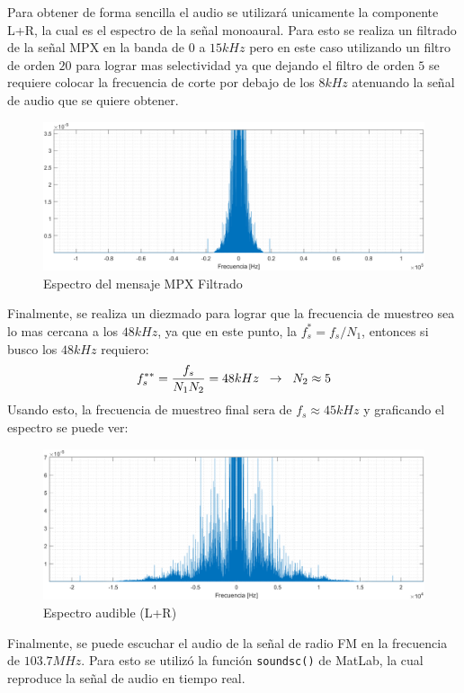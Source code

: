 Para obtener de forma sencilla el audio se utilizará unicamente la componente L+R, la cual es el espectro de la señal monoaural. Para esto se realiza un filtrado de la señal MPX en la banda de $0$ a $15kHz$ pero en este caso utilizando un filtro de orden $20$ para lograr mas selectividad ya que dejando el filtro de orden $5$ se requiere colocar la frecuencia de corte por debajo de los $8kHz$ atenuando la señal de audio que se quiere obtener.
\begin{figure}[H]
    \centering
    \includegraphics[width=\columnwidth]{images/2.5-mpx-filtrado.png}
    \caption{Espectro del mensaje MPX Filtrado}
    \label{fig:imagen8}
\end{figure}
Finalmente, se realiza un diezmado para lograr que la frecuencia de muestreo sea lo mas cercana a los $48kHz$, ya que en este punto, la $f^{*}_{s}=f_{s}/N_{1}$, entonces si busco los $48kHz$ requiero:
$$
f^{**}_{s} = \frac{f_{s}}{N_{1} N_{2}} = 48kHz
\hspace{2mm}\to\hspace{2mm}
N_{2} \approx 5
$$
Usando esto, la frecuencia de muestreo final sera de $f_{s} \approx 45kHz$ y graficando el espectro se puede ver:
\begin{figure}[H]
    \centering
    \includegraphics[width=\columnwidth]{images/2.6-mpx-final.png}
    \caption{Espectro audible (L+R)}
    \label{fig:imagen9}
\end{figure}
Finalmente, se puede escuchar el audio de la señal de radio FM en la frecuencia de $103.7 MHz$. Para esto se utilizó la función \texttt{soundsc()} de MatLab, la cual reproduce la señal de audio en tiempo real.
